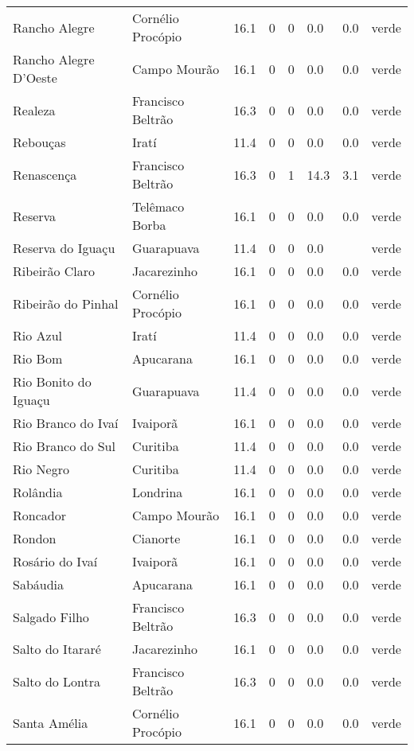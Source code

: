 \begin{longtable}{l|lllllll}
  Rancho Alegre & Cornélio Procópio & 16.1 & 0 & 0 & 0.0 & 0.0 & verde \\ 
  Rancho Alegre D'Oeste & Campo Mourão & 16.1 & 0 & 0 & 0.0 & 0.0 & verde \\ 
  Realeza & Francisco Beltrão & 16.3 & 0 & 0 & 0.0 & 0.0 & verde \\ 
  Rebouças & Iratí & 11.4 & 0 & 0 & 0.0 & 0.0 & verde \\ 
  Renascença & Francisco Beltrão & 16.3 & 0 & 1 & 14.3 & 3.1 & verde \\ 
  Reserva & Telêmaco Borba & 16.1 & 0 & 0 & 0.0 & 0.0 & verde \\ 
  Reserva do Iguaçu & Guarapuava & 11.4 & 0 & 0 & 0.0 &  & verde \\ 
  Ribeirão Claro & Jacarezinho & 16.1 & 0 & 0 & 0.0 & 0.0 & verde \\ 
  Ribeirão do Pinhal & Cornélio Procópio & 16.1 & 0 & 0 & 0.0 & 0.0 & verde \\ 
  Rio Azul & Iratí & 11.4 & 0 & 0 & 0.0 & 0.0 & verde \\ 
  Rio Bom & Apucarana & 16.1 & 0 & 0 & 0.0 & 0.0 & verde \\ 
  Rio Bonito do Iguaçu & Guarapuava & 11.4 & 0 & 0 & 0.0 & 0.0 & verde \\ 
  Rio Branco do Ivaí & Ivaiporã & 16.1 & 0 & 0 & 0.0 & 0.0 & verde \\ 
  Rio Branco do Sul & Curitiba & 11.4 & 0 & 0 & 0.0 & 0.0 & verde \\ 
  Rio Negro & Curitiba & 11.4 & 0 & 0 & 0.0 & 0.0 & verde \\ 
  Rolândia & Londrina & 16.1 & 0 & 0 & 0.0 & 0.0 & verde \\ 
  Roncador & Campo Mourão & 16.1 & 0 & 0 & 0.0 & 0.0 & verde \\ 
  Rondon & Cianorte & 16.1 & 0 & 0 & 0.0 & 0.0 & verde \\ 
  Rosário do Ivaí & Ivaiporã & 16.1 & 0 & 0 & 0.0 & 0.0 & verde \\ 
  Sabáudia & Apucarana & 16.1 & 0 & 0 & 0.0 & 0.0 & verde \\ 
  Salgado Filho & Francisco Beltrão & 16.3 & 0 & 0 & 0.0 & 0.0 & verde \\ 
  Salto do Itararé & Jacarezinho & 16.1 & 0 & 0 & 0.0 & 0.0 & verde \\ 
  Salto do Lontra & Francisco Beltrão & 16.3 & 0 & 0 & 0.0 & 0.0 & verde \\ 
  Santa Amélia & Cornélio Procópio & 16.1 & 0 & 0 & 0.0 & 0.0 & verde \\ 

\end{longtable}
